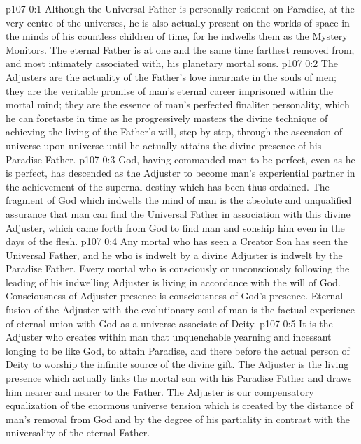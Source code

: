 \author{Solitary Messenger}
\vs p107 0:1 Although the Universal Father is personally resident on Paradise, at the very centre of the universes, he is also actually present on the worlds of space in the minds of his countless children of time, for he indwells them as the Mystery Monitors. The eternal Father is at one and the same time farthest removed from, and most intimately associated with, his planetary mortal sons.
\vs p107 0:2 The Adjusters are the actuality of the Father’s love incarnate in the souls of men; they are the veritable promise of man’s eternal career imprisoned within the mortal mind; they are the essence of man’s perfected finaliter personality, which he can foretaste in time as he progressively masters the divine technique of achieving the living of the Father’s will, step by step, through the ascension of universe upon universe until he actually attains the divine presence of his Paradise Father.
\vs p107 0:3 God, having commanded man to be perfect, even as he is perfect, has descended as the Adjuster to become man’s experiential partner in the achievement of the supernal destiny which has been thus ordained. The fragment of God which indwells the mind of man is the absolute and unqualified assurance that man can find the Universal Father in association with this divine Adjuster, which came forth from God to find man and sonship him even in the days of the flesh.
\vs p107 0:4 Any mortal who has seen a Creator Son has seen the Universal Father, and he who is indwelt by a divine Adjuster is indwelt by the Paradise Father. Every mortal who is consciously or unconsciously following the leading of his indwelling Adjuster is living in accordance with the will of God. Consciousness of Adjuster presence is consciousness of God’s presence. Eternal fusion of the Adjuster with the evolutionary soul of man is the factual experience of eternal union with God as a universe associate of Deity.
\vs p107 0:5 It is the Adjuster who creates within man that unquenchable yearning and incessant longing to be like God, to attain Paradise, and there before the actual person of Deity to worship the infinite source of the divine gift. The Adjuster is the living presence which actually links the mortal son with his Paradise Father and draws him nearer and nearer to the Father. The Adjuster is our compensatory equalization of the enormous universe tension which is created by the distance of man’s removal from God and by the degree of his partiality in contrast with the universality of the eternal Father.
